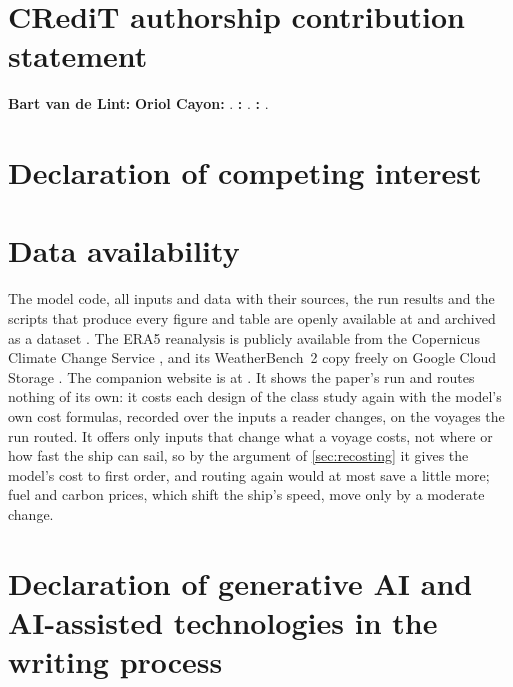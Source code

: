 \section*{CRediT authorship contribution statement}

\textbf{Bart van de Lint:}  \textbf{Oriol Cayon:} . \textbf{:} . \textbf{:} .

\section*{Declaration of competing interest}


\section*{Data availability}

The model code, all inputs and data with their sources, the run results and the scripts that produce every figure and table are openly available at \urlof{\repository} and archived as a dataset \citep{windshipopt_data}. The ERA5 reanalysis is publicly available from the Copernicus Climate Change Service \citep{hersbach2020}, and its WeatherBench~2 copy freely on Google Cloud Storage \citep{rasp2024}. The companion website is at \urlof{\website}. It shows the paper's run and routes nothing of its own: it costs each design of the class study again with the model's own cost formulas, recorded over the inputs a reader changes, on the voyages the run routed. It offers only inputs that change what a voyage costs, not where or how fast the ship can sail, so by the argument of \cref{sec:recosting} it gives the model's cost to first order, and routing again would at most save a little more; fuel and carbon prices, which shift the ship's speed, move only by a moderate change.

\section*{Declaration of generative AI and AI-assisted technologies in the writing process}

